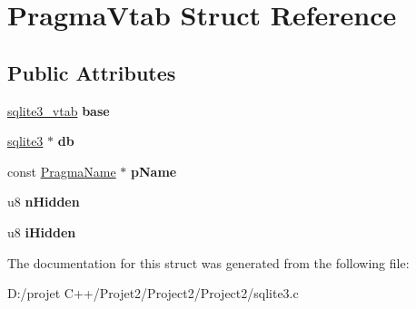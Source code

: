 \hypertarget{struct_pragma_vtab}{}\section{Pragma\+Vtab Struct Reference}
\label{struct_pragma_vtab}
\subsection*{Public Attributes}
\begin{DoxyCompactItemize}
\item 
\mbox{\label{struct_pragma_vtab_acc936896f2d2a169fcb19cdc2fe48086}} 
\mbox{\hyperlink{structsqlite3__vtab}{sqlite3\+\_\+vtab}} {\bfseries base}
\item 
\mbox{\label{struct_pragma_vtab_a954cec425127249deb5466af79e100a0}} 
\mbox{\hyperlink{structsqlite3}{sqlite3}} $\ast$ {\bfseries db}
\item 
\mbox{\label{struct_pragma_vtab_a71f8c640ec4f34272d6540c696ee1d8a}} 
const \mbox{\hyperlink{struct_pragma_name}{Pragma\+Name}} $\ast$ {\bfseries p\+Name}
\item 
\mbox{\label{struct_pragma_vtab_a35131d693653e37c757eeb6f1ff1a0fc}} 
u8 {\bfseries n\+Hidden}
\item 
\mbox{\label{struct_pragma_vtab_a88ed1130d9fce82bf60132abec659856}} 
u8 {\bfseries i\+Hidden}
\end{DoxyCompactItemize}


The documentation for this struct was generated from the following file\+:\begin{DoxyCompactItemize}
\item 
D\+:/projet C++/\+Projet2/\+Project2/\+Project2/sqlite3.\+c\end{DoxyCompactItemize}
